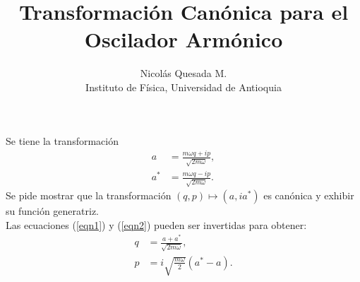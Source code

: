 \documentclass[spanish,12pt]{shreyasnotes}
\title{Transformaci\'on Can\'onica para el Oscilador Arm\'onico}
\author{Nicol\'as Quesada M.\\{\small \sf Instituto de F\'isica, Universidad de Antioquia}}
\date{}
\begin{document}
\maketitle

Se tiene la transformaci\'on 
\begin{subequations}
\begin{align}
a&=\frac{ m \omega q + i p }{
   \sqrt{ 2 m \omega }} ,
\label{eqn1}
\\
a^*&=\frac{ m \omega q - i p}{
   \sqrt{ 2m \omega }} .
\label{eqn2}
\end{align}
\end{subequations}
Se pide mostrar que la transformaci\'on $(q,p)\longmapsto(a,ia^{*})$ es can\'onica y exhibir su funci\'on generatriz.\\

Las ecuaciones (\ref{eqn1}) y (\ref{eqn2}) pueden ser invertidas para obtener:
\begin{subequations}
\begin{align}
q&=\frac{ a +a^* }{\sqrt{2 m \omega}},\\
p&=i  \sqrt{\frac{m \omega}{2}} \left(a^* -a \right).
\end{align}
\end{subequations}
\end{document}
